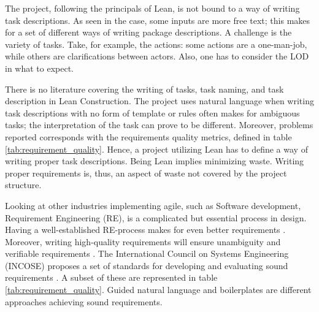 The project, following the principals of Lean, is not bound to a way of writing task descriptions. As seen in the case, some inputs are more free text; this makes for a set of different ways of writing package descriptions. A challenge is the variety of tasks. Take, for example, the actions: some actions are a one-man-job, while others are clarifications between actors. Also, one has to consider the LOD in what to expect. 

There is no literature covering the writing of tasks, task naming, and task description in Lean Construction. The project uses natural language when writing task descriptions with no form of template or rules often makes for ambiguous tasks; the interpretation of the task can prove to be different. Moreover, problems reported corresponds with the requirements quality metrics, defined in table \ref{tab:requirement_quality}. Hence, a project utilizing Lean has to define a way of writing proper task descriptions. Being Lean implies minimizing waste. Writing proper requirements is, thus, an aspect of waste not covered by the project structure.

Looking at other industries implementing agile, such as Software development, Requirement Engineering (RE), is a complicated but essential process in design. Having a well-established RE-process makes for even better requirements \citep{pandey2010effective}. Moreover, writing high-quality requirements will ensure unambiguity and verifiable requirements \citep{carson2015implementing}. The International Council on Systems Engineering (INCOSE) proposes a set of standards for developing and evaluating sound requirements \citep{incose2015guide}. A subset of these are represented in table \ref{tab:requirement_quality}. Guided natural language \citep{rolland1992natural} and boilerplates \citep{daramola2012pattern} are different approaches achieving sound requirements.

